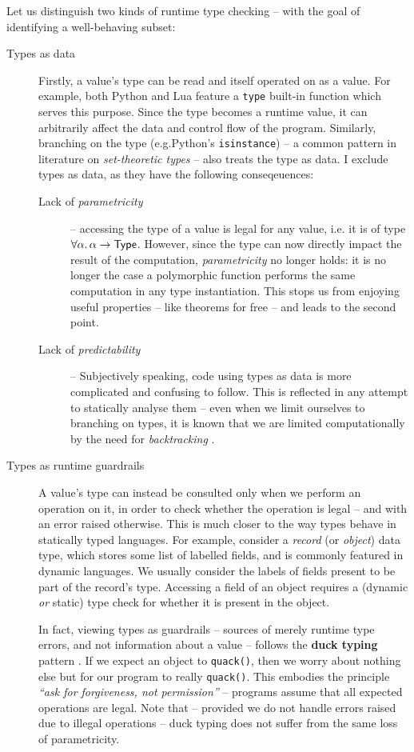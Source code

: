 Let us distinguish two kinds of runtime type checking -- with the goal of identifying a well-behaving subset: \begin{description}
    \item[Types as data] Firstly, a value's type can be read and itself operated on as a value. For example, both Python and Lua feature a \texttt{type} built-in function which serves this purpose. Since the type becomes a runtime value, it can arbitrarily affect the data and control flow of the program. 
    Similarly, branching on the type (e.g.\@ Python's \texttt{isinstance}) -- a common pattern in literature on \emph{set-theoretic types} -- also treats the type as data. I exclude types as data, as they have the following conseqeuences: \begin{description}
        \item[Lack of \emph{parametricity}] -- accessing the type of a value is legal for any value, i.e. it is of type $\forall \alpha \ldotp \alpha \to \textsf{Type}$. However, since the type can now directly impact the result of the computation, \emph{parametricity} no longer holds: it is no longer the case a polymorphic function performs the same computation in any type instantiation. This stops us from enjoying useful properties -- like theorems for free \cite{theorems-for-free} -- and leads to the second point.
        \item[Lack of \emph{predictability}] -- Subjectively speaking, code using types as data is more complicated and confusing to follow. This is reflected in any attempt to statically analyse them -- even when we limit ourselves to branching on types, it is known that we are limited computationally by the need for \emph{backtracking} \cite{polymorphic-set-theoretic-types}.
    \end{description}
    \item[Types as runtime guardrails] A value's type can instead be consulted only when we perform an operation on it, in order to check whether the operation is legal -- and with an error raised otherwise. This is much closer to the way types behave in statically typed languages.     
    For example, consider a \emph{record} (or \emph{object}) data type, which stores some list of labelled fields, and is commonly featured in dynamic languages. 
    We usually consider the labels of fields present to be part of the record's type.
    Accessing a field of an object requires a (dynamic \emph{or} static) type check for whether it is present in the object.
    
    In fact, viewing types as guardrails -- sources of merely runtime type errors, and not information about a value -- follows the \textbf{duck typing} pattern \cite{duck-typing}. If we expect an object to \texttt{quack()}, then we worry about nothing else but for our program to really \texttt{quack()}. This embodies the principle \textit{``ask for forgiveness, not permission''} -- programs assume that all expected operations are legal.
    Note that -- provided we do not handle errors raised due to illegal operations -- duck typing does not suffer from the same loss of parametricity.
\end{description}
